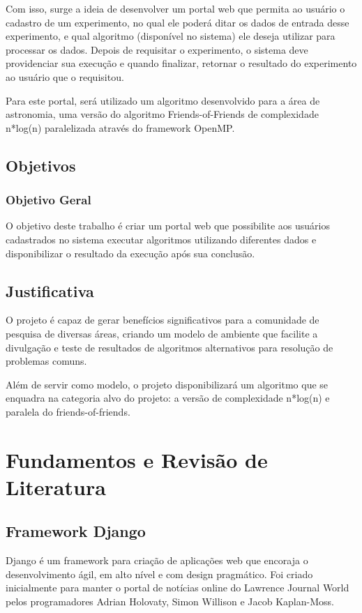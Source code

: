 \documentclass[tg]{mdtufsm}
\begin{document}
Com isso, surge a ideia de desenvolver um portal web que permita ao usuário o cadastro de um experimento, no qual ele poderá ditar os dados de entrada desse experimento, e qual algoritmo (disponível no sistema) ele deseja utilizar para processar os dados. Depois de requisitar o experimento, o sistema deve providenciar sua execução e quando finalizar, retornar o resultado do experimento ao usuário que o requisitou.

Para este portal, será utilizado um algoritmo desenvolvido para a área de astronomia, uma versão do algoritmo Friends-of-Friends de complexidade n*log(n) paralelizada através do framework OpenMP.

\section{Objetivos}

\subsection{Objetivo Geral}

O objetivo deste trabalho é criar um portal web que possibilite aos usuários cadastrados no sistema  executar algoritmos utilizando diferentes dados e disponibilizar o resultado da execução após sua conclusão.

\section{Justificativa}

O projeto é capaz de gerar benefícios significativos para a comunidade de pesquisa de diversas áreas, criando um modelo de ambiente que facilite a divulgação e teste de resultados de algoritmos alternativos para resolução de problemas comuns.

Além de servir como modelo, o projeto disponibilizará um algoritmo que se enquadra na categoria alvo do projeto: a versão de complexidade n*log(n) e paralela do friends-of-friends.

\chapter{Fundamentos e Revisão de Literatura}


\section{Framework Django}
Django\cite{django} é um framework para criação de aplicações web que encoraja o desenvolvimento ágil, em alto nível e com design pragmático. Foi criado inicialmente para manter o portal de notícias online do Lawrence
Journal World pelos programadores Adrian Holovaty, Simon Willison e Jacob Kaplan-Moss.
\end{document}
